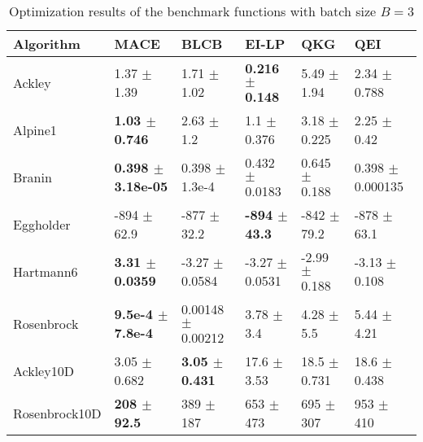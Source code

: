\documentclass{article}
\begin{document}
\begin{table*}[!htb]
    \centering
    \caption{Optimization results of the benchmark functions with batch size $B=3$}
    \label{tab:result_analytical_b3}
    \begin{tabular}{llllll}
        \toprule
        Algorithm     & MACE                          & BLCB                       & EI-LP                        & QKG                    & QEI                      \\
        \midrule
        Ackley        & 1.37           $\pm$  1.39      &  1.71         $\pm$  1.02      &  \textbf{0.216  $\pm$  0.148}  &  5.49   $\pm$  1.94   &  2.34   $\pm$  0.788     \\
        Alpine1       & \textbf{1.03   $\pm$  0.746}    &  2.63         $\pm$  1.2       &  1.1    $\pm$  0.376      &  3.18   $\pm$  0.225  &  2.25   $\pm$  0.42      \\
        Branin        & \textbf{0.398  $\pm$  3.18e-05} &  0.398        $\pm$  1.3e-4    &  0.432  $\pm$  0.0183     &  0.645  $\pm$  0.188  &  0.398  $\pm$  0.000135  \\
        Eggholder     & -894           $\pm$  62.9      &  -877         $\pm$  32.2      &  \textbf{-894   $\pm$  43.3}   &  -842   $\pm$  79.2   &  -878   $\pm$  63.1      \\
        Hartmann6     & \textbf{3.31   $\pm$  0.0359}   &  -3.27        $\pm$  0.0584    &  -3.27  $\pm$  0.0531     &  -2.99  $\pm$  0.188  &  -3.13  $\pm$  0.108     \\
        Rosenbrock    & \textbf{9.5e-4 $\pm$  7.8e-4}   &  0.00148      $\pm$  0.00212   &  3.78   $\pm$  3.4        &  4.28   $\pm$  5.5    &  5.44   $\pm$  4.21      \\
        Ackley10D     & 3.05           $\pm$  0.682     &  \textbf{3.05 $\pm$  0.431}    &  17.6   $\pm$  3.53       &  18.5   $\pm$  0.731  &  18.6   $\pm$  0.438     \\
        Rosenbrock10D & \textbf{208    $\pm$  92.5}     &  389          $\pm$  187       &  653    $\pm$  473        &  695    $\pm$  307    &  953    $\pm$  410       \\
        \bottomrule
    \end{tabular}
\end{table*}
\end{document}
